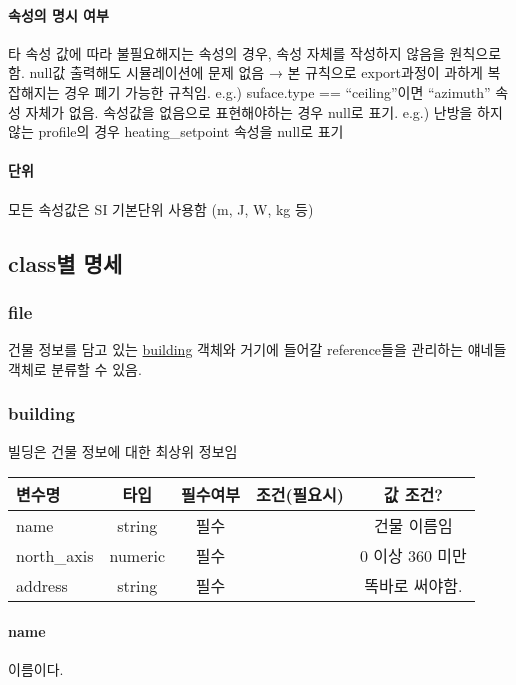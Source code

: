 \paragraph{속성의 명시 여부}
타 속성 값에 따라 불필요해지는 속성의 경우, 속성 자체를 작성하지 않음을 원칙으로 함. null값 출력해도 시뮬레이션에 문제 없음 → 본 규칙으로 export과정이 과하게 복잡해지는 경우 폐기 가능한 규칙임. e.g.) suface.type == “ceiling”이면 “azimuth” 속성 자체가 없음. 속성값을 없음으로 표현해야하는 경우 null로 표기. e.g.) 난방을 하지 않는 profile의 경우 heating\_setpoint 속성을 null로 표기

\paragraph{단위}
모든 속성값은 SI 기본단위 사용함 (m, J, W, kg 등)

\subsection{class별 명세}
\subsubsection{file}
건물 정보를 담고 있는 \hyperref[subsection:ioref:building]{building} 객체와 거기에 들어갈 reference들을 관리하는 얘네들 객체로 분류할 수 있음.

\subsubsection{building} \label{subsection:ioref:building}
빌딩은 건물 정보에 대한 최상위 정보임

\begin{table}[ht]
  \centering
  \begin{tabularx}{\textwidth}{l c c c c}
    \toprule
    변수명 & 타입  & 필수여부 & 조건(필요시) & 값 조건?\\ \midrule
    name & string & 필수 & & 건물 이름임 \\
    north\_axis & numeric & 필수 & & 0 이상 360 미만 \\
    address & string & 필수 & & 똑바로 써야함. \\ \bottomrule
  \end{tabularx}
\end{table}

\paragraph{name} 이름이다.
